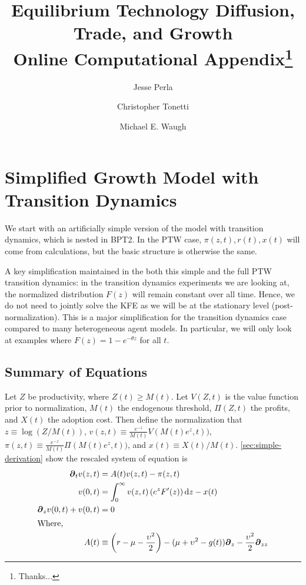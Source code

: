 \documentclass[11pt]{article}
\newcommand{\D}[1][]{\ensuremath{\boldsymbol{\partial}_{#1}}}
\newcommand{\diff}{\ensuremath{\mathrm{d}}}
\begin{document}
\title{Equilibrium Technology Diffusion, Trade, and Growth\\Online Computational Appendix\thanks{Thanks...}}
\author{Jesse Perla \and Christopher Tonetti \and Michael E. Waugh}
\maketitle

\section{Simplified Growth Model with Transition Dynamics}
We start with an artificially simple version of the model with transition dynamics, which is nested in BPT2.  In the PTW case, $\pi(z,t), r(t), x(t)$ will come from calculations, but the basic structure is otherwise the same.

A key simplification maintained in the both this simple and the full PTW transition dynamics: in the transition dynamics experiments we are looking at, the normalized distribution $F(z)$ will remain constant over all time.  Hence, we do not need to jointly solve the KFE as we will be at the stationary level (post-normalization).  This is a major simplification for the transition dynamics case compared to many heterogeneous agent models.  In particular, we will only look at examples where $F(z) = 1 - e^{-\theta z}$ for all $t$.

\subsection{Summary of Equations}
Let $Z$ be productivity, where $Z(t) \geq M(t)$.  Let $V(Z,t)$ is the value function prior to normalization, $M(t)$ the endogenous threshold, $\Pi(Z,t)$ the profits, and $X(t)$ the adoption cost.  Then define the normalization that $z \equiv \log(Z/M(t))$, $v(z,t) \equiv \frac{e^{-z}}{M(t)}V(M(t)e^z, t))$, $\pi(z,t) \equiv \frac{e^{-z}}{M(t)}\Pi(M(t)e^z, t))$, and $x(t) \equiv X(t)/M(t)$.  \cref{sec:simple-derivation} show the rescaled system of equation is
\begin{align}
\D[t]v(z,t) &= A(t)v(z,t) - \pi(z,t)\label{eq:simple-summary1}\\
v(0,t) &= \int_{0}^{\infty}  v(z,t) \left(e^z F'(z)\right) \diff z - x(t)\label{eq:simple-summary2}\\
\D[z]v(0,t) + v(0,t) &= 0\label{eq:simple-summary3}\\
\intertext{Where,}
A(t) &\equiv \left(r - \mu - \frac{\upsilon^2}{2}\right) - (\mu+ \upsilon^2 - g(t)) \D[z] - \frac{\upsilon^2}{2} \D[zz]\label{eq:simple-summary4}
\end{align} 
\end{document}
